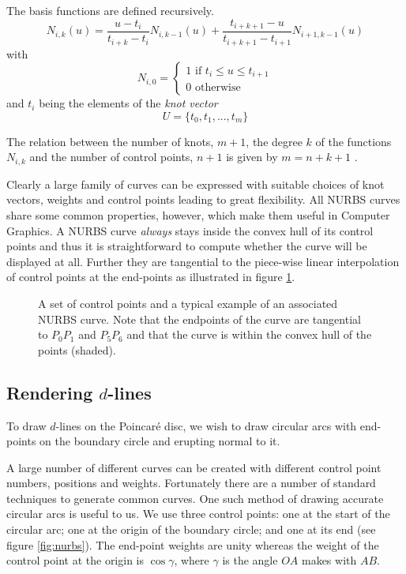 The basis functions are defined recursively.
\[
N_{i,k}(u) = \frac{u - t_i}{t_{i+k} - t_i} N_{i,k-1}(u) +
  \frac{t_{i+k+1} - u}{t_{i+k+1} - t_{i+1}} N_{i+1,k-1}(u)
\]
with
\[
N_{i,0} = 
\begin{cases}
1 \mbox{ if } t_i \le u \le t_{i+1} \\ 
0 \mbox{ otherwise} 
\end{cases}
\]
and $t_i$ being the elements of the \emph{knot vector}
\[
U = \{ t_0, t_1, ... , t_m \}
\]

The relation between the number of knots, $m+1$, the degree $k$ of 
the functions $N_{i,k}$ and the number of control points, $n+1$
is given by $m = n + k + 1$ \cite{peigl, rogers}.

Clearly a large family of curves can be expressed with suitable choices
of knot vectors, weights and control points leading to great flexibility.
All NURBS curves share some common properties, however, which make them
useful in Computer Graphics. A NURBS curve \emph{always} stays inside the
convex hull of its control points \cite{rogers} and thus it is straightforward
to compute whether the curve will be displayed at all. Further they
are tangential to the piece-wise linear interpolation of control
points at the end-points as illustrated in figure \ref{fig:samplenurb}.

\begin{figure} \centering
{}
\caption{A set of control points and a typical example of an associated
NURBS curve. Note that the endpoints of the curve are tangential to
$P_0P_1$ and $P_5P_6$ and that the curve is within the convex hull
of the points (shaded).}
\label{fig:samplenurb}
\end{figure}

\subsection{Rendering $d$-lines}

To draw $d$-lines on the Poincar\'e disc, we wish to draw circular arcs
with end-points on the boundary circle and erupting normal to it.

A large number of different curves can be created with different control 
point numbers, positions and weights. Fortunately there are a number of
standard techniques to generate common curves. One such method of
drawing accurate circular arcs\cite{NURBS:arc,nurbs-arc} is useful to us. 
We use three control
points: one at the start of the circular arc; one at the origin of the
boundary circle; and one
at its end (see figure \ref{fig:nurbs}). 
The end-point weights are unity whereas the weight of the control
point at the origin is $\cos \gamma$, where $\gamma$ is the angle
$OA$ makes with $AB$.

